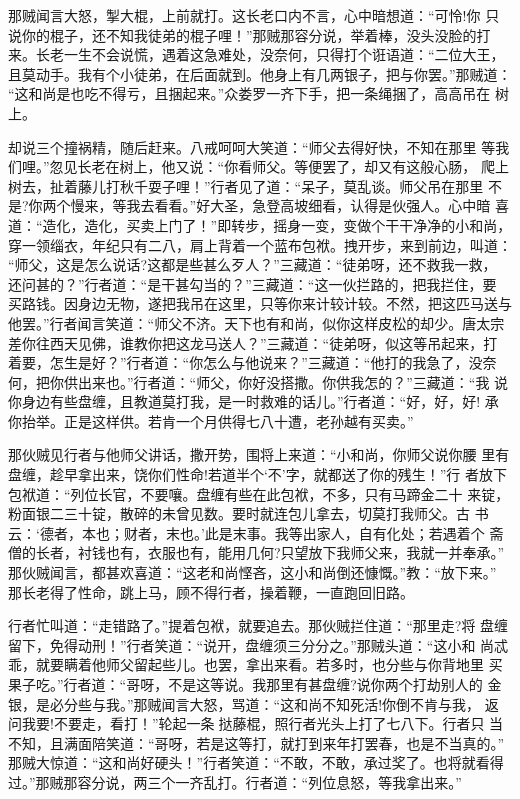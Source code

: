 那贼闻言大怒，掣大棍，上前就打。这长老口内不言，心中暗想道：“可怜!你
只说你的棍子，还不知我徒弟的棍子哩！”那贼那容分说，举着棒，没头没脸的打
来。长老一生不会说慌，遇着这急难处，没奈何，只得打个诳语道：“二位大王，
且莫动手。我有个小徒弟，在后面就到。他身上有几两银子，把与你罢。”那贼道：
“这和尚是也吃不得亏，且捆起来。”众娄罗一齐下手，把一条绳捆了，高高吊在
树上。

却说三个撞祸精，随后赶来。八戒呵呵大笑道：“师父去得好快，不知在那里
等我们哩。”忽见长老在树上，他又说：“你看师父。等便罢了，却又有这般心肠，
爬上树去，扯着藤儿打秋千耍子哩！”行者见了道：“呆子，莫乱谈。师父吊在那里
不是?你两个慢来，等我去看看。”好大圣，急登高坡细看，认得是伙强人。心中暗
喜道：“造化，造化，买卖上门了！”即转步，摇身一变，变做个干干净净的小和尚，
穿一领缁衣，年纪只有二八，肩上背着一个蓝布包袱。拽开步，来到前边，叫道：
“师父，这是怎么说话?这都是些甚么歹人？”三藏道：“徒弟呀，还不救我一救，
还问甚的？”行者道：“是干甚勾当的？”三藏道：“这一伙拦路的，把我拦住，要
买路钱。因身边无物，遂把我吊在这里，只等你来计较计较。不然，把这匹马送与
他罢。”行者闻言笑道：“师父不济。天下也有和尚，似你这样皮松的却少。唐太宗
差你往西天见佛，谁教你把这龙马送人？”三藏道：“徒弟呀，似这等吊起来，打
着要，怎生是好？”行者道：“你怎么与他说来？”三藏道：“他打的我急了，没奈
何，把你供出来也。”行者道：“师父，你好没搭撒。你供我怎的？”三藏道：“我
说你身边有些盘缠，且教道莫打我，是一时救难的话儿。”行者道：“好，好，好!
承你抬举。正是这样供。若肯一个月供得七八十遭，老孙越有买卖。”

那伙贼见行者与他师父讲话，撒开势，围将上来道：“小和尚，你师父说你腰
里有盘缠，趁早拿出来，饶你们性命!若道半个‘不’字，就都送了你的残生！”行
者放下包袱道：“列位长官，不要嚷。盘缠有些在此包袱，不多，只有马蹄金二十
来锭，粉面银二三十锭，散碎的未曾见数。要时就连包儿拿去，切莫打我师父。古
书云：‘德者，本也；财者，末也。’此是末事。我等出家人，自有化处；若遇着个
斋僧的长者，衬钱也有，衣服也有，能用几何?只望放下我师父来，我就一并奉承。”
那伙贼闻言，都甚欢喜道：“这老和尚悭吝，这小和尚倒还慷慨。”教：“放下来。”
那长老得了性命，跳上马，顾不得行者，操着鞭，一直跑回旧路。

行者忙叫道：“走错路了。”提着包袱，就要追去。那伙贼拦住道：“那里走?将
盘缠留下，免得动刑！”行者笑道：“说开，盘缠须三分分之。”那贼头道：“这小和
尚忒乖，就要瞒着他师父留起些儿。也罢，拿出来看。若多时，也分些与你背地里
买果子吃。”行者道：“哥呀，不是这等说。我那里有甚盘缠?说你两个打劫别人的
金银，是必分些与我。”那贼闻言大怒，骂道：“这和尚不知死活!你倒不肯与我，
返问我要!不要走，看打！”轮起一条挞藤棍，照行者光头上打了七八下。行者只
当不知，且满面陪笑道：“哥呀，若是这等打，就打到来年打罢春，也是不当真的。”
那贼大惊道：“这和尚好硬头！”行者笑道：“不敢，不敢，承过奖了。也将就看得
过。”那贼那容分说，两三个一齐乱打。行者道：“列位息怒，等我拿出来。”


